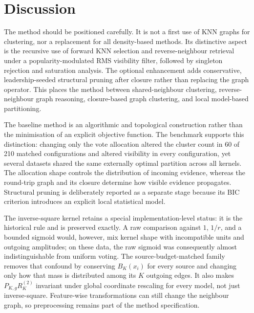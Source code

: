 \documentclass[pdflatex,sn-mathphys-num]{sn-jnl}
\begin{document}
\section{Discussion}\label{sec:discussion}

The method should be positioned carefully. It is not a first use of KNN graphs for clustering, nor a replacement for all density-based methods. Its distinctive aspect is the recursive use of forward KNN selection and reverse-neighbour retrieval under a popularity-modulated RMS visibility filter, followed by singleton rejection and saturation analysis. The optional enhancement adds conservative, leadership-seeded structural pruning after closure rather than replacing the graph operator. This places the method between shared-neighbour clustering, reverse-neighbour graph reasoning, closure-based graph clustering, and local model-based partitioning.

The baseline method is an algorithmic and topological construction rather than the minimisation of an explicit objective function. The benchmark supports this distinction: changing only the vote allocation altered the cluster count in 60 of 210 matched configurations and altered visibility in every configuration, yet several datasets shared the same externally optimal partition across all kernels. The allocation shape controls the distribution of incoming evidence, whereas the round-trip graph and its closure determine how visible evidence propagates. Structural pruning is deliberately reported as a separate stage because its BIC criterion introduces an explicit local statistical model.

The inverse-square kernel retains a special implementation-level status: it is
the historical rule and is preserved exactly.  A raw comparison against $1$,
$1/r$, and a bounded sigmoid would, however, mix kernel shape with incompatible
units and outgoing amplitudes; on these data, the raw sigmoid was consequently
almost indistinguishable from uniform voting.  The source-budget-matched family
removes that confound by conserving $B_K(x_i)$ for every source and changing
only how that mass is distributed among its $K$ outgoing edges.  It also makes
$P_{K,g}R_K^{(2)}$ invariant under global coordinate rescaling for every model,
not just inverse-square.  Feature-wise transformations can still change the
neighbour graph, so preprocessing remains part of the method specification.
\end{document}

